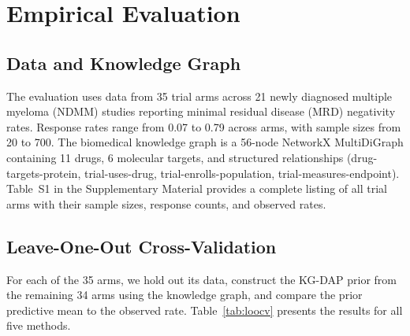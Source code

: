 \documentclass[12pt]{article}
\begin{document}
\section{Empirical Evaluation}
\label{sec:results}

\subsection{Data and Knowledge Graph}
\label{sec:data}

The evaluation uses data from 35 trial arms across 21 newly diagnosed multiple myeloma (NDMM) studies reporting minimal residual disease (MRD) negativity rates. Response rates range from 0.07 to 0.79 across arms, with sample sizes from 20 to 700. The biomedical knowledge graph is a 56-node NetworkX MultiDiGraph containing 11 drugs, 6 molecular targets, and structured relationships (drug-targets-protein, trial-uses-drug, trial-enrolls-population, trial-measures-endpoint). Table~S1 in the Supplementary Material provides a complete listing of all trial arms with their sample sizes, response counts, and observed rates.

\subsection{Leave-One-Out Cross-Validation}
\label{sec:loocv}

For each of the 35 arms, we hold out its data, construct the KG-DAP prior from the remaining 34 arms using the knowledge graph, and compare the prior predictive mean to the observed rate. Table~\ref{tab:loocv} presents the results for all five methods.
\end{document}
